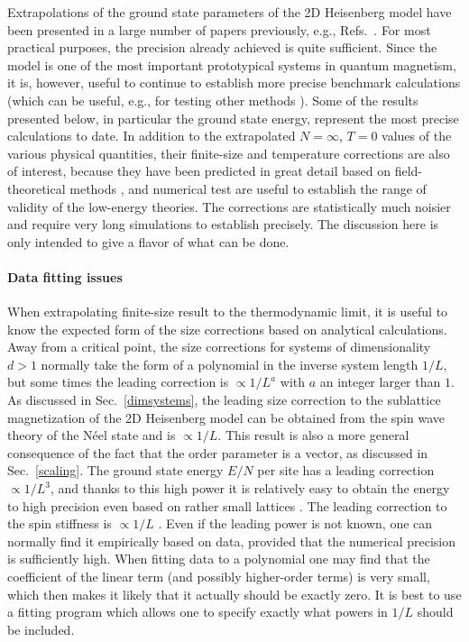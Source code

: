 \documentclass[draft,numberedheadings]{aipproc}
\begin{document}
Extrapolations of the ground state parameters of the 2D Heisenberg model have been presented in a large number of papers previously, e.g., 
Refs.~\cite{runge92,wiese92,sandvik97,kim98,beard98}. 
For most practical purposes, the precision already achieved is quite sufficient. Since the model is one of the most important 
prototypical systems in quantum magnetism, it is, however, useful to continue to establish more precise benchmark calculations (which can be useful, e.g., for testing
other methods \cite{chernyshev}). Some of the results presented below, in particular the ground state energy, represent the most precise calculations to date. 
In addition to the extrapolated $N=\infty$, $T=0$ values of the various physical quantities, their finite-size and temperature corrections are also of interest, 
because they have been predicted in great detail based on field-theoretical methods \cite{hasenfratz93}, and numerical test are useful to establish the range of
validity of the low-energy theories. The corrections are statistically much noisier and require very long simulations to establish precisely. The discussion here is
only intended to give a flavor of what can be done.

\paragraph{Data fitting issues}

When extrapolating finite-size result to the thermodynamic limit, it is useful to know the expected form of the size corrections based on analytical calculations.
Away from  a critical point, the size corrections for systems of dimensionality $d>1$ normally take the form of a polynomial in the inverse system length $1/L$, 
but some times the leading correction is $\propto 1/L^a$ with $a$ an integer larger than $1$. As discussed in Sec.~\ref{dimsystems}, the leading size correction to the 
sublattice magnetization of the 2D Heisenberg model can be obtained from the spin wave theory of the N\'eel state and is $\propto 1/L$. This result is also a more 
general consequence of the fact that the order parameter is a vector, as discussed in Sec.~\ref{scaling}. The ground state energy $E/N$ per site has a 
leading correction $\propto 1/L^3$, and thanks to this high power it is relatively easy to obtain the energy to high precision even based on rather small lattices 
\cite{sandvik97}. The leading correction to the spin stiffness is $\propto 1/L$ \cite{einarsson}. Even if the leading power is not known, one can normally find it 
empirically based on data, provided that the numerical precision is sufficiently high. When fitting data to a polynomial one may find that the coefficient of the linear 
term (and possibly higher-order terms) is very small, which then makes it likely that it actually should be exactly zero. It is best to use a fitting program which 
allows one to specify exactly what powers in $1/L$ should be included. 
\end{document}
